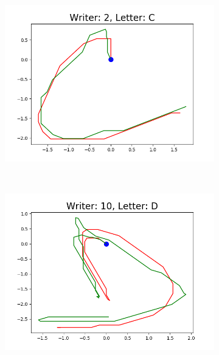 \begin{figure}
\begin{subfigure}[b]{0.17\textwidth}
          \includegraphics[width=\textwidth]{images/framework/comparison_figures/C_2.png}
      \end{subfigure}
      ~
      \begin{subfigure}[b]{0.17\textwidth}
          \includegraphics[width=\textwidth]{images/framework/comparison_figures/D_10.png}
      \end{subfigure}
      ~
      \begin{subfigure}[b]{0.17\textwidth}

\end{subfigure}
\end{figure}
